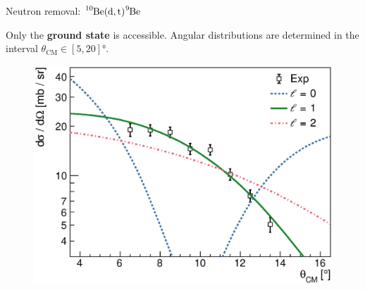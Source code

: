 \documentclass[sans,
frameno, %
mp,
usenames,dvipsnames, %
onlytextwidth, %
t,%
11pt]{beamer}
\newcommand{\iso}[2]{\ce{^{#1}#2}}
\begin{document}
\begin{frame}{Neutron removal: $\iso{10}{Be}(\textrm{d}, \textrm{t})\iso{9}{Be}$}
    \only<+>
    {
        Only the \textbf{ground state} is accessible. Angular distributions are determined in the interval $\theta_{\textrm{CM}} \in \left[5, 20\right]\unit{\degree}$.
        \begin{figure}
            \begin{minipage}[t]{0.48\linewidth}
                \centering
            \end{minipage}
            \hfill
            \begin{minipage}[t]{0.48\linewidth}
                \centering
                \includegraphics[width=\textwidth]{figures/Workshop/10Be_dt_xs.eps}

\end{minipage}
\end{figure}}
\end{frame}
\end{document}
